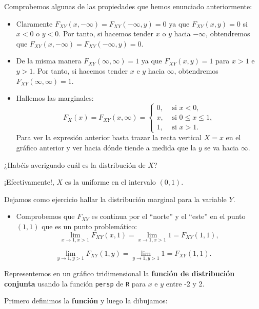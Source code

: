 \documentclass[]{book}
\providecommand{\tightlist}{%
  \setlength{\itemsep}{0pt}\setlength{\parskip}{0pt}}
\begin{document}
Comprobemos algunas de las propiedades que hemos enunciado anteriormente:

\begin{itemize}
\item
  Claramente \(F_{XY}(x,-\infty)=F_{XY}(-\infty,y)=0\) ya que \(F_{XY}(x,y)=0\) si \(x<0\) o \(y<0\). Por tanto, si hacemos tender \(x\) o \(y\) hacia \(-\infty\), obtendremos que \(F_{XY}(x,-\infty)=F_{XY}(-\infty,y)=0\).
\item
  De la misma manera \(F_{XY}(\infty,\infty)=1\) ya que \(F_{XY}(x,y)=1\) para \(x>1\) e \(y>1\). Por tanto, si hacemos tender \(x\) e \(y\) hacia \(\infty\), obtendremos \(F_{XY}(\infty,\infty)=1\).
\item
  Hallemos las marginales:
  \[
  F_X(x)=F_{XY}(x,\infty)=\begin{cases}
  0, & \mbox{ si }x<0,\\
  x, & \mbox{ si } 0\leq x\leq 1,\\
  1, & \mbox{ si } x>1.
  \end{cases}
  \]
  Para ver la expresión anterior basta trazar la recta vertical \(X=x\) en el gráfico anterior y ver hacia dónde tiende a medida que la \(y\) se va hacia \(\infty\).
\end{itemize}

¿Habéis averiguado cuál es la distribución de \(X\)?

¡Efectivamente!, \(X\) es la uniforme en el intervalo \((0,1)\).

Dejamos como ejercicio hallar la distribución marginal para la variable \(Y\).

\begin{itemize}
\tightlist
\item
  Comprobemos que \(F_{XY}\) es continua por el ``norte'' y el ``este'' en el punto \((1,1)\) que es un punto problemático:
  \[
  \lim_{x\to 1,x> 1} F_{XY}(x,1)=\lim_{x\to 1,x> 1} 1  = F_{XY}(1,1),
  \]
\end{itemize}

\[
\lim_{y\to 1,y> 1} F_{XY}(1,y)=\lim_{y\to 1,y> 1} 1  = F_{XY}(1,1).
\]

Representemos en un gráfico tridimensional la \textbf{función de distribución conjunta} usando la función \texttt{persp} de \texttt{R} para \(x\) e \(y\) entre -2 y 2.

Primero definimos la \textbf{función} y luego la dibujamos:
\end{document}
